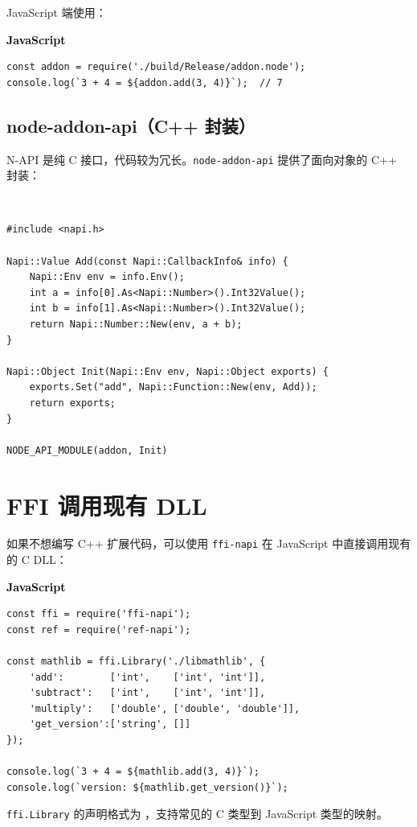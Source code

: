 \documentclass[12pt,a4paper,fontset=fandol]{ctexbook}
\newcommand{\cpplabel}{%
  \begin{tcolorbox}[enhanced,colback=cppheadbg,colframe=cppheadbg,
    arc=1mm,boxrule=0mm,left=6pt,right=6pt,top=2pt,bottom=2pt,
    halign=left,oversize]
    \textcolor{white}{\small\bfseries C++}
  \end{tcolorbox}\vspace{-4pt}}
\newcommand{\jslabel}{%
  \begin{tcolorbox}[enhanced,colback=jsheadbg,colframe=jsheadbg,
    arc=1mm,boxrule=0mm,left=6pt,right=6pt,top=2pt,bottom=2pt,
    halign=left,oversize]
    \textcolor{black}{\small\bfseries JavaScript}
  \end{tcolorbox}\vspace{-4pt}}
\newcommand{\cpp}[1]{C++#1}
\newcommand{\Tp}[1]{\texttt{#1}}
\begin{document}
JavaScript 端使用：

\jslabel
\begin{lstlisting}[style=jsstyle]
const addon = require('./build/Release/addon.node');
console.log(`3 + 4 = ${addon.add(3, 4)}`);  // 7
\end{lstlisting}

\subsection{node-addon-api（C++ 封装）}

N-API 是纯 C 接口，代码较为冗长。\texttt{node-addon-api} 提供了面向对象的 \cpp{} 封装：

\cpplabel
\begin{lstlisting}[style=cppstyle]
#include <napi.h>

Napi::Value Add(const Napi::CallbackInfo& info) {
    Napi::Env env = info.Env();
    int a = info[0].As<Napi::Number>().Int32Value();
    int b = info[1].As<Napi::Number>().Int32Value();
    return Napi::Number::New(env, a + b);
}

Napi::Object Init(Napi::Env env, Napi::Object exports) {
    exports.Set("add", Napi::Function::New(env, Add));
    return exports;
}

NODE_API_MODULE(addon, Init)
\end{lstlisting}

\section{FFI 调用现有 DLL}

如果不想编写 \cpp{} 扩展代码，可以使用 \texttt{ffi-napi} 在 JavaScript 中直接调用现有的 C DLL：

\jslabel
\begin{lstlisting}[style=jsstyle]
const ffi = require('ffi-napi');
const ref = require('ref-napi');

const mathlib = ffi.Library('./libmathlib', {
    'add':        ['int',    ['int', 'int']],
    'subtract':   ['int',    ['int', 'int']],
    'multiply':   ['double', ['double', 'double']],
    'get_version':['string', []]
});

console.log(`3 + 4 = ${mathlib.add(3, 4)}`);
console.log(`version: ${mathlib.get_version()}`);
\end{lstlisting}

\Tp{ffi.Library} 的声明格式为 \texttt{}，支持常见的 C 类型到 JavaScript 类型的映射。
\end{document}
